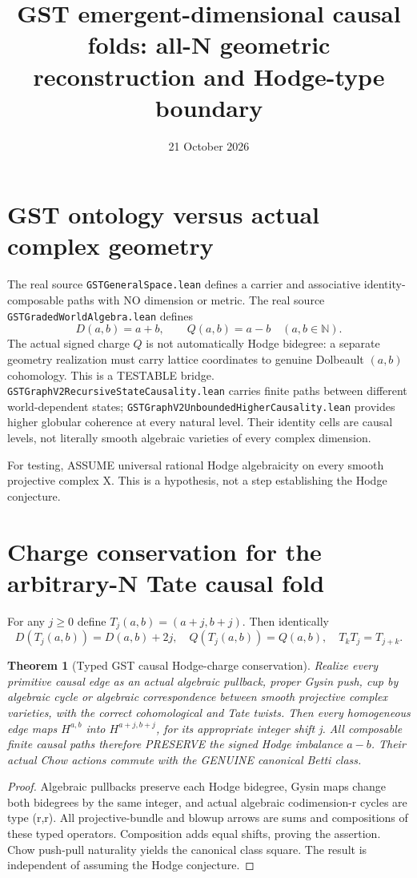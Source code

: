 \documentclass[11pt]{article}
\title{GST emergent-dimensional causal folds: all-N geometric reconstruction and Hodge-type boundary}
\date{21 October 2026}
\newtheorem{theorem}{Theorem}
\begin{document}
\maketitle

\section{GST ontology versus actual complex geometry}
The real source \texttt{GSTGeneralSpace.lean} defines a carrier
and associative identity-composable paths with NO dimension or metric.
The real source \texttt{GSTGradedWorldAlgebra.lean} defines
\[
 D(a,b)=a+b,\qquad Q(a,b)=a-b\quad (a,b\in\mathbb N).
\]
The actual signed charge \(Q\) is not automatically Hodge bidegree:
a separate geometry realization must carry lattice coordinates
to genuine Dolbeault \((a,b)\) cohomology. This is a TESTABLE bridge.
\texttt{GSTGraphV2RecursiveStateCausality.lean} carries finite paths
between different world-dependent states;
\texttt{GSTGraphV2UnboundedHigherCausality.lean} provides
higher globular coherence at every natural level.
Their identity cells are causal levels, not literally
smooth algebraic varieties of every complex dimension.

For testing, ASSUME universal rational Hodge algebraicity
on every smooth projective complex X. This is a
hypothesis, not a step establishing the Hodge conjecture.

\section{Charge conservation for the arbitrary-N Tate causal fold}
For any \(j\ge0\) define
\(T_j(a,b)=(a+j,b+j)\). Then identically
\[
 \boxed{D(T_j(a,b))=D(a,b)+2j,\quad
 Q(T_j(a,b))=Q(a,b),\quad T_kT_j=T_{j+k}.} \tag{1}
\]
\begin{theorem}[Typed GST causal Hodge-charge conservation]
Realize every primitive causal edge as an actual algebraic
pullback, proper Gysin push, cup by algebraic cycle or
algebraic correspondence between smooth projective complex
varieties, with the correct cohomological and Tate twists.
Then every homogeneous edge maps \(H^{a,b}\) into
\(H^{a+j,b+j}\), for its appropriate integer shift j.
All composable finite causal paths therefore PRESERVE
the signed Hodge imbalance \(a-b\). Their actual
Chow actions commute with the GENUINE canonical Betti class.
\end{theorem}
\begin{proof}
Algebraic pullbacks preserve each Hodge bidegree,
Gysin maps change both bidegrees by the same integer,
and actual algebraic codimension-r cycles are type (r,r).
All projective-bundle and blowup arrows are sums and
compositions of these typed operators.
Composition adds equal shifts, proving the assertion.
Chow push-pull naturality yields the canonical class square.
The result is independent of assuming the Hodge conjecture.
\end{proof}
\end{document}
